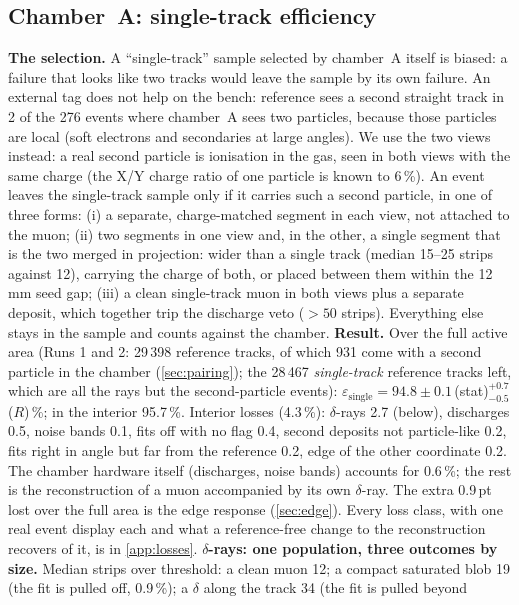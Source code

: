 \subsection{Chamber~A: single-track efficiency}\label{sec:single}
\textbf{The selection.} A ``single-track'' sample selected by chamber~A itself is biased: a failure that looks like two
tracks would leave the sample by its own failure. An external tag does not help on the bench: reference sees a second straight
track in 2 of the 276 events where chamber~A sees two particles, because those particles are local (soft electrons and
secondaries at large angles). We use the two views instead: a real second particle is ionisation in the gas, seen in both
views with the same charge (the X/Y charge ratio of one particle is known to 6\,\%). An event leaves the single-track
sample only if it carries such a second particle, in one of three forms: (i) a separate, charge-matched segment in each
view, not attached to the muon; (ii) two segments in one view and, in the other, a single segment that is the two merged
in projection: wider than a single track (median 15--25 strips against 12), carrying the charge of both, or placed
between them within the 12\,mm seed gap; (iii) a clean single-track muon in both views plus a separate deposit, which
together trip the discharge veto (${>}50$ strips). Everything else stays in the sample and counts against the chamber.
\textbf{Result.} Over the full active area (Runs 1 and 2: 29\,398 reference tracks, of which 931 come with a second particle in the chamber
(\cref{sec:pairing}); the 28\,467 \emph{single-track} reference tracks left, which are all the rays but the second-particle events):
$\varepsilon_\mathrm{single}=94.8\pm0.1$\,(stat)$^{+0.7}_{-0.5}$\,($R$)\,\%; in the interior 95.7\,\%. Interior
losses (4.3\,\%): $\delta$-rays 2.7 (below), discharges 0.5, noise bands 0.1, fits off with no flag 0.4, second deposits
not particle-like 0.2, fits right in angle but far from the reference 0.2, edge of the other coordinate 0.2. The chamber hardware itself (discharges, noise bands) accounts for 0.6\,\%; the rest is the
reconstruction of a muon accompanied by its own $\delta$-ray. The extra 0.9\,pt lost over the full area is the edge
response (\cref{sec:edge}). Every loss class, with one real event display each and what a reference-free change to the
reconstruction recovers of it, is in \cref{app:losses}.
\textbf{$\delta$-rays: one population, three outcomes by size.} Median strips over threshold: a clean muon 12; a
compact saturated blob 19 (the fit is pulled off, 0.9\,\%); a $\delta$ along the track 34 (the fit is pulled beyond

